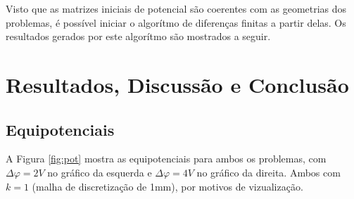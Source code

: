 \documentclass{aleph-revista}
\begin{document}
Visto que as matrizes iniciais de potencial são coerentes com as geometrias dos problemas, é possível iniciar o algorítmo de diferenças finitas a partir delas. Os resultados gerados por este algorítmo são mostrados a seguir.

\section{Resultados, Discussão e Conclusão}

\subsection{Equipotenciais}

A Figura \ref{fig:pot} mostra as equipotenciais para ambos os problemas, com $\Delta \varphi = 2V$ no gráfico da esquerda e $\Delta \varphi = 4V$ no gráfico da direita. Ambos com $k=1$ (malha de discretização de 1mm), por motivos de vizualização.
\end{document}
